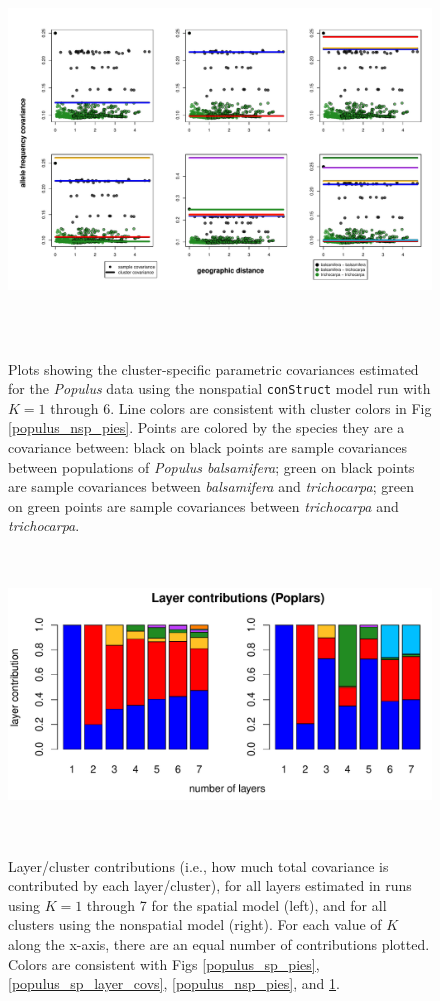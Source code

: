 \documentclass[12pt]{article}
\newcommand{\tri}{\textit{trichocarpa}}
\newcommand{\bals}{\textit{balsamifera}}
\begin{document}
\begin{figure}
	\centering
		{\includegraphics[width=6in,height=4in]{figs/populus/populus_nsp_layer_covs.pdf}}
	\caption{
	Plots showing the cluster-specific parametric covariances 
	estimated for the \textit{Populus} data using 
	the nonspatial \texttt{conStruct} model run with $K=1$ through 6.
	Line colors are consistent with cluster colors in Fig \ref{populus_nsp_pies}.
	Points are colored by the species they are a covariance between:
	black on black points are sample covariances between populations of \textit{Populus balsamifera};
	green on black points are sample covariances between \bals{} and \tri{};
	green on green points are sample covariances between \tri{} and \tri{}.
    }\label{populus_nsp_layer_covs}
\end{figure}

\begin{figure}
	\centering
		{\includegraphics[width=6in,height=3in]{figs/populus/populus_laycon_barplots.pdf}}
	\caption{
	Layer/cluster contributions (i.e., how much total covariance is contributed by each layer/cluster), 
	for all layers estimated in runs using $K = 1$ through 7 
	for the spatial model (left), 
	and for all clusters using the nonspatial model (right).
	For each value of $K$ along the x-axis, there are an equal number of contributions plotted.
	Colors are consistent with Figs \ref{populus_sp_pies}, \ref{populus_sp_layer_covs}, \ref{populus_nsp_pies}, and \ref{populus_nsp_layer_covs}.
    }\label{populus_laycon}
\end{figure}
\end{document}
